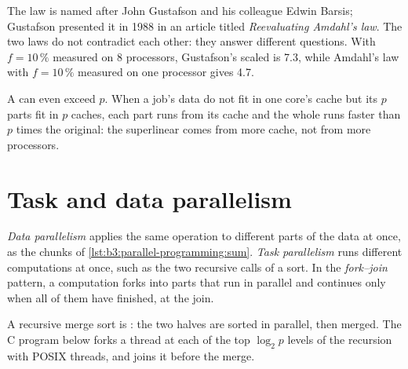 The law is named after John Gustafson and his colleague Edwin Barsis; Gustafson presented it in 1988 in an article titled \emph{Reevaluating Amdahl's law}. %
The two laws do not contradict each other: they answer different questions. With $f = 10\,\%$ measured on 8 processors, Gustafson's scaled  is 7.3, while Amdahl's law with $f = 10\,\%$ measured on one processor gives 4.7.

A  can even exceed $p$. When a job's data do not fit in one core's cache but its $p$ parts fit in $p$ caches, each part runs from its cache and the whole runs faster than $p$ times the original: the superlinear  comes from more cache, not from more processors.

\section{Task and data parallelism}\label{sec:b3:parallel-programming:kinds}

\begin{definition}\label{def:b3:parallel-programming:kinds}
\emph{Data parallelism} applies the same operation to different parts of the data at once, as the chunks of \cref{lst:b3:parallel-programming:sum}. \emph{Task parallelism} runs different computations at once, such as the two recursive calls of a sort. In the \emph{fork--join} pattern, a computation forks into parts that run in parallel and continues only when all of them have finished, at the join.
\end{definition}

A recursive merge sort is : the two halves are sorted in parallel, then merged. The C program below forks a thread at each of the top $\log_2 p$ levels of the recursion with POSIX threads, and joins it before the merge.

\label{lst:b3:parallel-programming:psort}

\label{out:b3:parallel-programming:psort}

